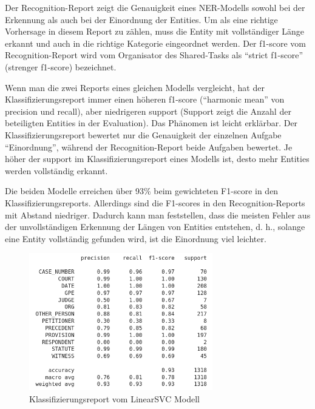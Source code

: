 \documentclass[paper=A4, ngerman, fontsize=12pt]{article}
\begin{document}
	\indent
	Der Recognition-Report zeigt die Genauigkeit eines NER-Modells sowohl bei der Erkennung als auch bei der Einordnung der Entities. Um als eine richtige Vorhersage in diesem Report zu zählen, muss die Entity mit vollständiger Länge erkannt und auch in die richtige Kategorie eingeordnet werden. Der f1-score vom Recognition-Report wird vom Organisator des Shared-Tasks als \enquote{strict f1-score} (strenger f1-score) bezeichnet.  
	
	\indent
	Wenn man die zwei Reports eines gleichen Modells vergleicht, hat der Klassifizierungsreport immer einen höheren f1-score (\enquote{harmonic mean} von precision und recall), aber niedrigeren support (Support zeigt die Anzahl der beteiligten Entities in der Evaluation). Das Phänomen ist leicht erklärbar. Der Klassifizierungsreport bewertet nur die Genauigkeit der einzelnen Aufgabe \enquote{Einordnung}, während der Recognition-Report beide Aufgaben bewertet. Je höher der support im Klassifizierungsreport eines Modells ist, desto mehr Entities werden vollständig erkannt. 
	
	\indent
	Die beiden Modelle erreichen über 93\% beim gewichteten F1-score in den Klassifizierungsreports. Allerdings sind die F1-scores in den Recognition-Reports mit Abstand niedriger. Dadurch kann man feststellen, dass die meisten Fehler aus der unvollständigen Erkennung der Längen von Entities entstehen, d. h., solange eine Entity vollständig gefunden wird, ist die Einordnung viel leichter. 
	
	\begin{figure}
		\begin{center}
			\includegraphics[width=8cm]{Illustrations/svc_classify.png}
			\caption{Klassifizierungsreport vom LinearSVC Modell}
			\label{Klassifizierungsreport vom LinearSVC Modell}
		\end{center}
	\end{figure}
\end{document}
